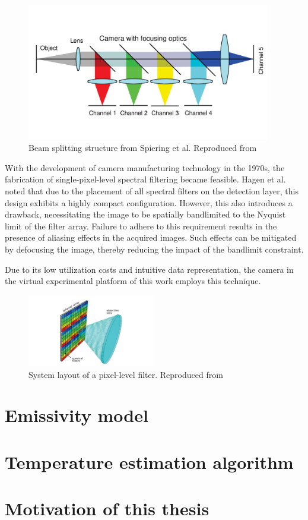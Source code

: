 \begin{figure}[htbp]
    \centering
    \includegraphics[width=0.95\textwidth]{figures/beam_splitting_early.pdf}
    \caption{Beam splitting structure from Spiering et al. Reproduced from \cite{Hagen.2013}}
    \label{fig: beam_splitting}
\end{figure}

With the development of camera manufacturing technology in the 1970s, 
the fabrication of single-pixel-level spectral filtering became feasible\cite{BAYERB..1976}.
Hagen et al. noted that due to the placement of all spectral filters on the 
detection layer, this design exhibits a highly compact configuration. 
However, this also introduces a drawback, necessitating the image to be 
spatially bandlimited to the Nyquist limit of the filter array. 
Failure to adhere to this requirement results in the presence of 
aliasing effects in the acquired images. Such effects can be mitigated 
by defocusing the image, thereby reducing the impact of the bandlimit 
constraint\cite{Hagen.2013}.


Due to its low utilization costs and intuitive data representation, the 
camera in the virtual experimental platform of this work employs this 
technique.

\begin{figure}[htbp]
    \centering
    \includegraphics[width=0.5\textwidth]{figures/pixel_level_filter.pdf}
    \caption{System layout of a pixel-level filter. Reproduced from \cite{Hagen.2013}}
    \label{fig: pixel_filter}
\end{figure}

%
%
\section{Emissivity model}%

%
%
\section{Temperature estimation algorithm}


\section{Motivation of this thesis}
